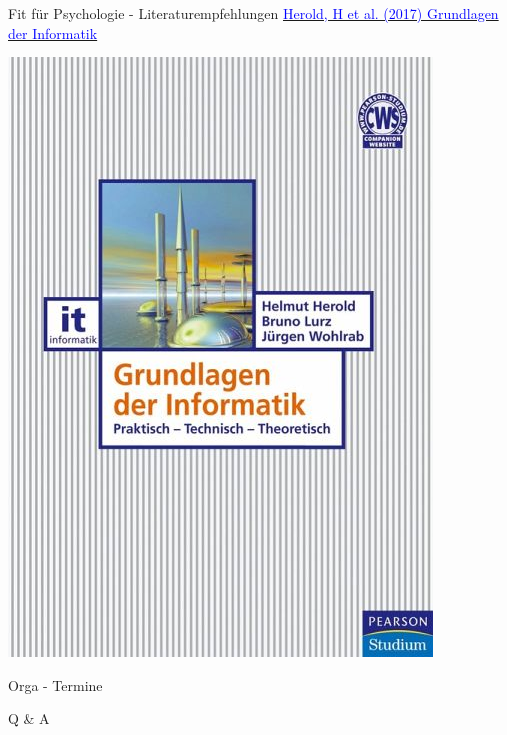 \documentclass[
  8pt,
  ignorenonframetext,
  t]{beamer}
\begin{document}
\begin{frame}{Fit für Psychologie - Literaturempfehlungen}
\protect\hypertarget{fit-fuxfcr-psychologie---literaturempfehlungen-2}{}
\href{https://www.pearson.de/grundlagen-der-informatik-9783863268039}{\textcolor{blue}{Herold, H et al. (2017) Grundlagen der Informatik}}

\vspace{5mm}

\begin{center}\includegraphics[width=0.35\linewidth]{../Abbildungen/glmi_0_herold} \end{center}
\end{frame}

\begin{frame}{Orga - Termine}
\protect\hypertarget{orga---termine}{}
\color{red}{TODO: kleinen Wochenplan erstellen?}
\end{frame}

\begin{frame}[plain]{}
\protect\hypertarget{section-2}{}
Q \& A
\end{frame}
\end{document}
